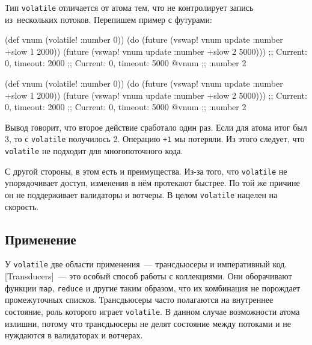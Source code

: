 \fi

Тип \verb|volatile| отличается от атома тем, что не контролирует запись
из~нескольких потоков. Перепишем пример с футурами:

\ifnarrow

\begin{english}
  \begin{clojure}
(def vnum (volatile! {:number 0}))
(do (future (vswap! vnum update
              :number +slow 1 2000))
    (future (vswap! vnum update
              :number +slow 2 5000)))
;; Current: 0, timeout: 2000
;; Current: 0, timeout: 5000
@vnum ;; {:number 2}
  \end{clojure}
\end{english}

\else

\begin{english}
  \begin{clojure}
(def vnum (volatile! {:number 0}))
(do (future (vswap! vnum update :number +slow 1 2000))
    (future (vswap! vnum update :number +slow 2 5000)))
;; Current: 0, timeout: 2000
;; Current: 0, timeout: 5000
@vnum ;; {:number 2}
  \end{clojure}
\end{english}

\fi


Вывод говорит, что второе действие сработало один раз. Если для атома итог был
3, то с \verb|volatile| получилось 2. Операцию \verb|+1| мы потеряли. Из
этого следует, что \verb|volatile| не подходит для многопоточного кода.

С другой стороны, в этом есть и преимущества. Из-за того, что \verb|volatile| не
упорядочивает доступ, изменения в нём протекают быстрее. По той же причине он не
поддерживает валидаторы и вотчеры. В целом \verb|volatile| нацелен на скорость.

\subsection{Применение}

У \verb|volatile| две области применения~--- трансдьюсеры и императивный
код. [Trans\-ducers]~---
это особый способ работы с коллекциями. Они оборачивают функции \verb|map|,
\verb|reduce| и другие таким образом, что их комбинация не порождает
промежуточных списков. Трансдьюсеры часто полагаются на внутреннее состояние,
роль которого играет \texttt{volatile}. В данном случае возможности атома
излишни, потому что трансдьюсеры не делят состояние между потоками и не
нуждаются в валидаторах и вотчерах.

